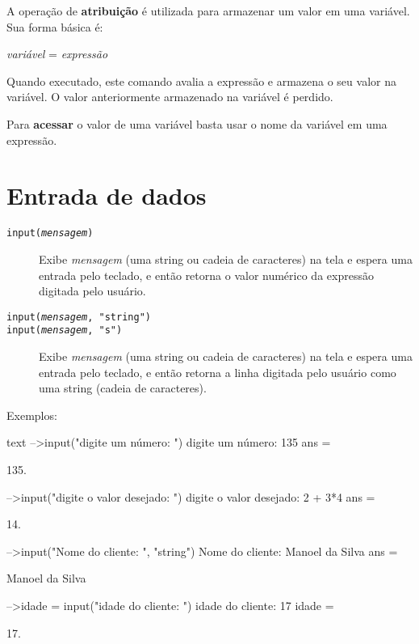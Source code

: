 \documentclass[11pt,fleqn]{practice}
\begin{document}
A operação de \textbf{atribuição} é utilizada para armazenar um valor em
uma variável. Sua forma básica é:
\begin{center}
  \emph{variável} = \emph{expressão}
\end{center}
Quando executado, este comando avalia a expressão e armazena o seu valor
na variável. O valor anteriormente armazenado na variável é perdido.

\begin{center}
\end{center}

Para \textbf{acessar} o valor de uma variável basta usar o nome da
variável em uma expressão.


\section{Entrada de dados}

\begin{description}
  \item [\texttt{input(\textsl{mensagem})}]\mbox{}\newline Exibe
  \textsl{mensagem} (uma string ou cadeia de caracteres) na tela e
  espera uma entrada pelo teclado, e então retorna o valor numérico da
  expressão digitada pelo usuário.

  \item [\texttt{input(\textsl{mensagem}, "string")}]
  \item [\texttt{input(\textsl{mensagem}, "s")}]\mbox{}\newline Exibe
  \textsl{mensagem} (uma string ou cadeia de caracteres) na tela e
  espera uma entrada pelo teclado, e então retorna a linha digitada pelo
  usuário como uma string (cadeia de caracteres).
\end{description}

Exemplos:

\begin{lst}{text}
-->input("digite um número: ")
digite um número: 135
 ans  =
 
    135.  

-->input("digite o valor desejado: ")
digite o valor desejado: 2 + 3*4
 ans  =
 
    14.  
 
-->input("Nome do cliente: ", "string")
Nome do cliente: Manoel da Silva
 ans  =
 
 Manoel da Silva   

-->idade = input("idade do cliente: ")
idade do cliente: 17
 idade  =
 
    17.  
\end{lst}
\end{document}

